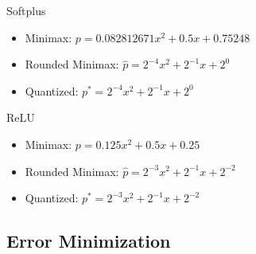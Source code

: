 \documentclass[conference]{IEEEtran}
\begin{document}
Softplus 
\begin{itemize}
    \item Minimax: $p = 0.082812671x^2 +  0.5x + 0.75248$
    \item Rounded Minimax: $\hat{p} = 2^{-4}x^2 + 2^{-1}x +  2^{0}$
    \item Quantized: $p^* = 2^{-4}x^2 + 2^{-1}x +  2^{0}$
\end{itemize}

ReLU 
\begin{itemize}
    \item Minimax: $p = 0.125x^2 +  0.5x + 0.25$
    \item Rounded Minimax: $\hat{p} = 2^{-3}x^2 + 2^{-1}x +  2^{-2}$
    \item Quantized: $p^* = 2^{-3}x^2 + 2^{-1}x +  2^{-2}$
\end{itemize}

\subsection{Error Minimization}
\end{document}
